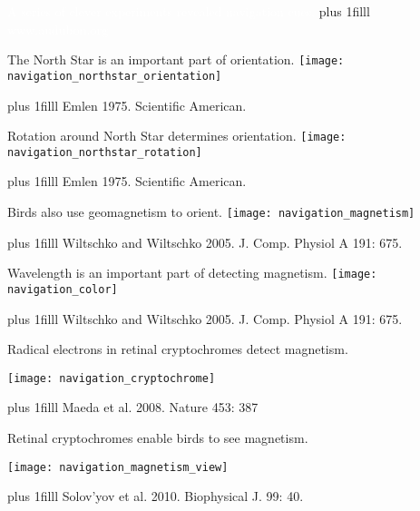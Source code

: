 \documentclass[t]{beamer}
\newcommand\imagecredit[1]{%
	\vskip0pt plus 1filll \tiny #1}%
\begin{document}
{
\begin{frame}[t,plain]{\textcolor{white}{A series of clever experiments revealed navigation cues.}}
	\imagecredit{\hfill\textcolor{white}{www.audubon.org}}
\end{frame}
}

{
\begin{frame}[t,plain]{The North Star is an important part of orientation.}
	\texttt{[image: navigation\_northstar\_orientation]}

	\imagecredit{\hfill Emlen 1975. Scientific American.}
\end{frame}
}

{
\begin{frame}[t,plain]{Rotation around North Star determines orientation.}
	\centering
		\texttt{[image: navigation\_northstar\_rotation]}

	\imagecredit{\hfill Emlen 1975. Scientific American.}
\end{frame}
}

{
\begin{frame}[t,plain]{Birds also use geomagnetism to orient.}
	\centering
		\texttt{[image: navigation\_magnetism]}

	\imagecredit{\hfill Wiltschko and Wiltschko 2005. J. Comp. Physiol A 191: 675.}
\end{frame}
}

{
\begin{frame}[t,plain]{Wavelength is an important part of detecting magnetism.}
	\centering
		\texttt{[image: navigation\_color]}

	\imagecredit{\hfill Wiltschko and Wiltschko 2005. J. Comp. Physiol A 191: 675.}
\end{frame}
}

{
\begin{frame}[t,plain]{Radical electrons in retinal cryptochromes detect magnetism.}
	\begin{center}
		\texttt{[image: navigation\_cryptochrome]}
	\end{center}
	
	\imagecredit{\hfill Maeda et al. 2008. Nature 453: 387}
\end{frame}
}

{
\begin{frame}[t,plain]{Retinal cryptochromes enable birds to see magnetism.}
	\begin{center}
		\texttt{[image: navigation\_magnetism\_view]}
	\end{center}
	
	\imagecredit{\hfill Solov’yov et al. 2010. Biophysical J. 99: 40.}
\end{frame}
}
\end{document}
